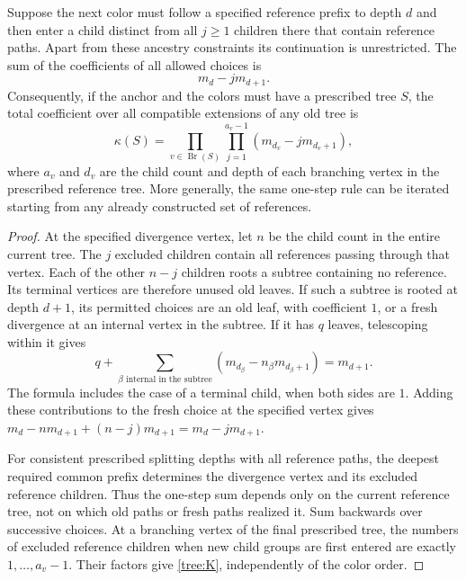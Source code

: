 \begin{lemma}\label{tree:reference-total}
Suppose the next color must follow a specified reference prefix to
depth $d$ and then enter a child distinct from all $j\geq1$ children
there that contain reference paths.  Apart from these ancestry
constraints its continuation is unrestricted.  The sum of the
coefficients of all allowed choices is
\begin{equation}\label{tree:one-reference-total}
  m_d-jm_{d+1}.
\end{equation}
Consequently, if the anchor and the colors must have a prescribed
tree $S$, the total coefficient over all compatible extensions of
any old tree is
\begin{equation}\label{tree:K}
 \kappa(S)=\prod_{v\in\operatorname{Br}(S)}
           \prod_{j=1}^{a_v-1}(m_{d_v}-jm_{d_v+1}),
\end{equation}
where $a_v$ and $d_v$ are the child count and depth of each branching
vertex in the prescribed reference tree.  More generally, the same
one-step rule can be iterated starting from any already constructed
set of references.
\end{lemma}

\begin{proof}
At the specified divergence vertex, let $n$ be the child count in
the entire current tree.  The $j$ excluded children contain all
references passing through that vertex.  Each of the other $n-j$
children roots a subtree containing no reference.  Its terminal
vertices are therefore unused old leaves.  If such a subtree is
rooted at depth $d+1$, its permitted choices are an old leaf, with
coefficient $1$, or a fresh divergence at an internal vertex in the
subtree.  If it has $q$ leaves, telescoping within it gives
\[
  q+\sum_{\beta\text{ internal in the subtree}}
       (m_{d_\beta}-n_\beta m_{d_\beta+1})=m_{d+1}.
\]
The formula includes the case of a terminal child, when both sides
are $1$.  Adding these contributions to the fresh choice at the
specified vertex gives
$m_d-nm_{d+1}+(n-j)m_{d+1}=m_d-jm_{d+1}$.

For consistent prescribed splitting depths with all reference paths,
the deepest required common prefix determines the divergence vertex
and its excluded reference children.  Thus the one-step sum depends
only on the current reference tree, not on which old paths or fresh
paths realized it.  Sum backwards over successive choices.  At a
branching vertex of the final prescribed tree, the numbers of
excluded reference children when new child groups are first entered
are exactly $1,\ldots,a_v-1$.  Their factors give
\eqref{tree:K}, independently of the color order.
\end{proof}

